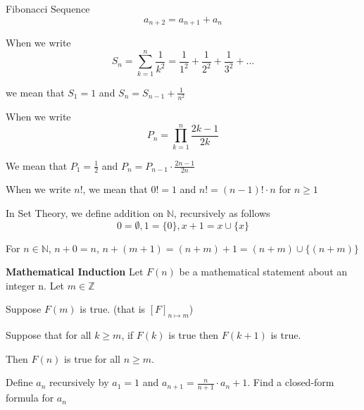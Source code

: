 \begin{exmp}
Fibonacci Sequence \[a_{n+2} = a_{n+1} + a_n\]
\end{exmp}

\begin{exmp}
When we write \[S_n = \sum_{k=1}^n \frac{1}{k^2} = \frac{1}{1^2}+\frac{1}{2^2}+\frac{1}{3^2}+\dots\]

we mean that $S_1 = 1$ and $\displaystyle S_n = S_{n-1} + \frac{1}{n^2}$
\end{exmp}

\begin{exmp}
When we write \[P_n=\prod_{k=1}^n \frac{2k-1}{2k}\]

We mean that $\displaystyle P_1 = \frac{1}{2}$ and $\displaystyle P_n = P_{n-1} \cdot \frac{2n-1}{2n}$
\end{exmp}

\begin{exmp}
When we write $n!$, we mean that $0! = 1$ and $n! = (n-1)!\cdot n$ for $n\geq 1$
\end{exmp}

\begin{exmp}
In Set Theory, we define addition on $\mathbb{N}$, recursively as follows
\[0=\emptyset, 1 = \{0\}, x+1 = x\cup \{x\}\]

For $n\in \mathbb{N}$, $n+0 = n$, $n+(m+1) = (n+m)+1  = (n+m)\cup \{(n+m)\}$
\end{exmp}

\begin{thm}
\textbf{Mathematical Induction} Let $F(n)$ be a mathematical statement about an integer n. Let $m\in \mathbb{Z}$

Suppose $F(m)$ is true. (that is $[F]_{n\mapsto m}$)

Suppose that for all $k\geq m$, if $F(k)$ is true then $F(k+1)$ is true.

Then $F(n)$ is true for all $n\geq m$.
\end{thm}

\begin{exmp}
Define $a_n$ recursively by $a_1 = 1$ and $\displaystyle a_{n+1} = \frac{n}{n+1} \cdot a_n + 1$. Find a closed-form formula for $a_n$ 
\end{exmp}


